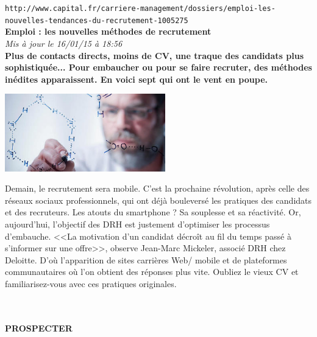 \documentclass[11pt,twoside,a4paper]{article}
\begin{document}
\setlength\parindent{0pt}

\texttt{http://www.capital.fr/carriere-management/dossiers/emploi-les-nouvelles-tendances-du-recrutement-1005275}~\\

\textbf{\LARGE Emploi : les nouvelles m{\'e}thodes de recrutement} ~\\

\emph{\small Mis {\`a} jour le 16/01/15 {\`a} 18:56} ~\\

\textbf{Plus de contacts directs, moins de CV, une traque des candidats plus sophistiqu{\'e}e... Pour embaucher ou pour se faire recruter, des m{\'e}thodes in{\'e}dites apparaissent. En voici sept qui ont le vent en poupe. } ~\\

\begin{minipage}[ht]{7.00cm}
	\includegraphics[width=6.95cm]{img/chercheurs-imagesource_bloc_article_grande_image.jpg}
\end{minipage} \hfill \begin{minipage}[ht]{0.65\textwidth}
	Demain, le recrutement sera mobile. C'est la prochaine r{\'e}volution, apr{\`e}s celle des r{\'e}seaux sociaux professionnels, qui ont d{\'e}j{\`a} boulevers{\'e} les pratiques des candidats et des recruteurs. Les atouts du smartphone ? Sa souplesse et sa r{\'e}activit{\'e}. Or, aujourd'hui, l'objectif des DRH est justement d'optimiser les processus d'embauche. <<La motivation d'un candidat d{\'e}cro{\^i}t au fil du temps pass{\'e} {\`a} s'informer sur une offre>>, observe Jean-Marc Mickeler, associ{\'e} DRH chez Deloitte. D'o{\`u} l'apparition de sites carri{\`e}res Web/ mobile et de plateformes communautaires o{\`u} l'on obtient des r{\'e}ponses plus vite. Oubliez le vieux CV et familiarisez-vous avec ces pratiques originales. %
\end{minipage}~\\~\\

\textbf{\textsc{PROSPECTER}}~\\
\end{document}
